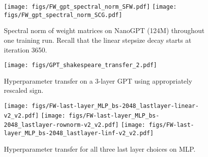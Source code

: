 \begin{figure}[t]
\centering
\texttt{[image: figs/FW\_gpt\_spectral\_norm\_SFW.pdf]}
\texttt{[image: figs/FW\_gpt\_spectral\_norm\_SCG.pdf]}%
\caption{Spectral norm of weight matrices on NanoGPT (124M) throughout one training run. Recall that the linear stepsize decay starts at iteration 3650.}
\label{fig:nanoGPT:spectral-norm}
\end{figure}


\begin{figure}[!h]
\centering
\texttt{[image: figs/GPT\_shakespeare\_transfer\_2.pdf]}%
\caption{Hyperparameter transfer on a 3-layer GPT using appropriately rescaled sign.}
\label{fig:GPT:shakespeare:sign}
\end{figure}

\begin{figure*}[!h]
\centering
\texttt{[image: figs/FW-last-layer\_MLP\_bs-2048\_lastlayer-linear-v2\_v2.pdf]}%
\texttt{[image: figs/FW-last-layer\_MLP\_bs-2048\_lastlayer-rownorm-v2\_v2.pdf]}
\texttt{[image: figs/FW-last-layer\_MLP\_bs-2048\_lastlayer-linf-v2\_v2.pdf]}%
\caption{Hyperparameter transfer for all three last layer choices on MLP.}
\label{fig:MLP:last-layer:transfer}
\end{figure*}



